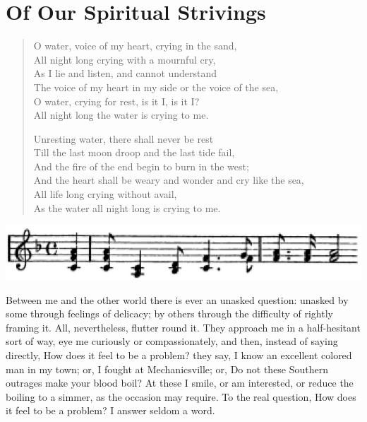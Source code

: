 
\author{W. E. B. Du Bois}
\chapter{Of Our Spiritual Strivings}


\begin{verse}
O water, voice of my heart, crying in the sand,\\
\vin All night long crying with a mournful cry,\\
As I lie and listen, and cannot understand\\
\vin\vin The voice of my heart in my side or the voice of the
sea,\\
\vin O water, crying for rest, is it I, is it I?\\
\vin\vin All night long the water is crying to me.

Unresting water, there shall never be rest\\
\vin Till the last moon droop and the last tide fail,\\
And the fire of the end begin to burn in the west;\\
\vin\vin And the heart shall be weary and wonder and cry like
the sea,\\
\vin All life long crying without avail,\\
\vin\vin As the water all night long is crying to me.
\end{verse}

\begin{center}
\includegraphics{texts/music.eps}
\end{center}

\noindent Between me and the other world there is ever an unasked
question: unasked by some through feelings of delicacy; by others
through the difficulty of rightly framing it. All, nevertheless,
flutter round it. They approach me in a half-hesitant sort of way, eye
me curiously or compassionately, and then, instead of saying directly,
How does it feel to be a problem? they say, I know an excellent
 colored man in my town; or, I fought at Mechanicsville; or,
Do not these Southern outrages make your blood boil? At these I smile,
or am interested, or reduce the boiling to a simmer, as the occasion
may require. To the real question, How does it feel to be a problem? I
answer seldom a word.

